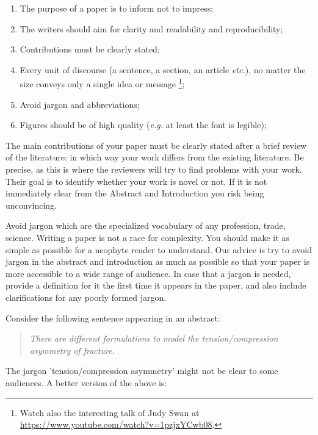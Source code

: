 \documentclass[authoryear,12pta4paper,fleqn]{article}
\makeatletter
\newcommand{\eg}{\textit{e.g.}\xspace}
\newcommand{\etc}{\textit{etc.}\@\xspace}
\numberwithin{equation}{section}
\theoremstyle{remark}
\makeatother
\begin{document}
\begin{enumerate}
\item The purpose of a paper is to inform not to impress;
\item The writers should aim for clarity and readability and  reproducibility;
\item Contributions must be clearly stated;
\item Every unit of discourse (a sentence, a section, an article \etc), no matter the size conveys only a single idea or message \citep{gopen1990science,McCarthy}\footnote{Watch also the interesting talk of Judy Swan at \url{https://www.youtube.com/watch?v=1pzjxYCwb08}.};
\item Avoid jargon and abbreviations;%
\item Figures should be of high quality (\eg at least the font is legible);
\end{enumerate}

The main contributions of your paper must be clearly stated after a brief review of the literature: in which way your work differs from the existing literature. Be precise, as this is where the reviewers will try to find problems with your work. Their goal is to identify whether your work is novel or not. If it is not immediately clear from the Abstract and Introduction you risk being unconvincing. 



Avoid jargon which are the specialized vocabulary of any profession, trade, science.  Writing a paper is not a race for complexity. You should make it as simple as possible for a neophyte reader to understand.
Our advice is try to avoid jargon in the abstract and introduction as much as possible so that your paper is more accessible to a wide range of audience. In case that a jargon is needed, provide a definition for it the first time it appears in the paper, and also include clarifications for any poorly formed jargon.

Consider the following sentence appearing in an abstract:

 \begin{quote}
  \textit{There are different formulations  to model the tension/compression asymmetry of fracture.}
 \end{quote}
The jargon 'tension/compression asymmetry' might not be clear to some audiences. A better version of the above is:
\end{document}
